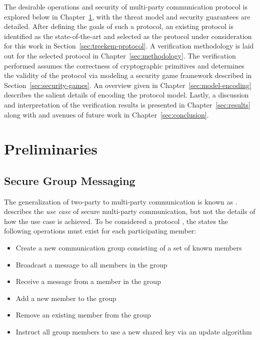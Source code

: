 The desirable operations and security of multi-party communication protocol is explored below in Chapter\ \ref{sec:preliminaries}, with the threat model and security guarantees are detailed.
After defining the goals of such a protocol, an existing protocol is identified as the state-of-the-art and selected as the protocol under consideration for this work in Section\ \ref{sec:treekem-protocol}.
A verification methodology is laid out for the selected protocol in Chapter\ \ref{sec:methodology}.
The verification performed assumes the correctness of cryptographic primitives and determines the validity of the protocol via modeling a security game framework described in Section\ \ref{sec:security-games}.
An overview given in Chapter\ \ref{sec:model-encoding} describes the salient details of encoding the protocol model.
Lastly, a discussion and interpretation of the verification results is presented in Chapter\ \ref{sec:results} along with and avenues of future work in Chapter\ \ref{sec:conclusion}.


\hypertarget{sec:preliminaries}{%
\chapter{Preliminaries}\label{sec:preliminaries}}


\hypertarget{sec:secure-group-messaging}{%
\section{Secure Group Messaging}\label{sec:secure-group-messaging}}

The generalization of two-party  to multi-party communication is known as  \autocite{cohn2018ends}.
 describes the \emph{use case} of secure multi-party communication, but not the details of how the use case is achieved.
To be considered a  protocol \autocite{ietf-mls-protocol-14}, the  states the following operations must exist for each participating member: 

\begin{itemize}
\item Create a new communication group consisting of a set of known members
\item Broadcast a message to all members in the group
\item Receive a message from a member in the group
\item Add a new member to the group
\item Remove an existing member from the group
\item Instruct all group members to use a new shared key via an update algorithm
\end{itemize}

